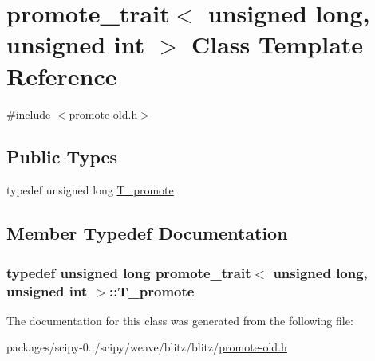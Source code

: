 \hypertarget{classpromote__trait_3_01unsigned_01long_00_01unsigned_01int_01_4}{}\section{promote\+\_\+trait$<$ unsigned long, unsigned int $>$ Class Template Reference}
\label{classpromote__trait_3_01unsigned_01long_00_01unsigned_01int_01_4}


{\ttfamily \#include $<$promote-\/old.\+h$>$}

\subsection*{Public Types}
\begin{DoxyCompactItemize}
\item 
typedef unsigned long \hyperlink{classpromote__trait_3_01unsigned_01long_00_01unsigned_01int_01_4_ae2cc40b18e0d61b3a720c33ed9dff20f}{T\+\_\+promote}
\end{DoxyCompactItemize}


\subsection{Member Typedef Documentation}
\hypertarget{classpromote__trait_3_01unsigned_01long_00_01unsigned_01int_01_4_ae2cc40b18e0d61b3a720c33ed9dff20f}{}
\subsubsection[{T\+\_\+promote}]{\setlength{\rightskip}{0pt plus 5cm}typedef unsigned long {\bf promote\+\_\+trait}$<$ unsigned long, unsigned int $>$\+::{\bf T\+\_\+promote}}\label{classpromote__trait_3_01unsigned_01long_00_01unsigned_01int_01_4_ae2cc40b18e0d61b3a720c33ed9dff20f}


The documentation for this class was generated from the following file\+:\begin{DoxyCompactItemize}
\item 
packages/scipy-\/0../scipy/weave/blitz/blitz/\hyperlink{promote-old_8h}{promote-\/old.\+h}\end{DoxyCompactItemize}
